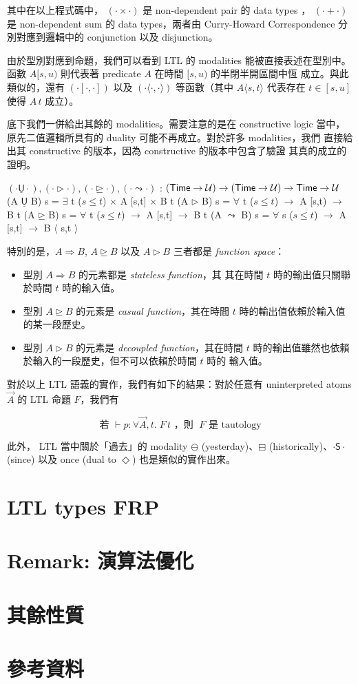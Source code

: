 \documentclass{article}
\newcommand{\U}{\mathcal{U}}
\begin{document}
  其中在以上程式碼中， $(\cdot\times\cdot)$ 是 non-dependent pair 的 data types
  ， $(\cdot+\cdot)$ 是 non-dependent sum 的 data types，兩者由 Curry-Howard
  Correspondence 分別對應到邏輯中的 conjunction 以及 disjunction。

  由於型別對應到命題，我們可以看到 LTL 的 modalities 能被直接表述在型別中。
  函數 $A [s,u)$ 則代表著 predicate $A$ 在時間 $[s,u)$ 的半閉半開區間中恆
  成立。與此類似的，還有 $(\cdot[\cdot,\cdot])$ 以及
  $(\cdot\langle\cdot,\cdot\rangle)$ 等函數（其中 $A\langle s,t\rangle$
  代表存在 $t\in [s,u]$ 使得 $A\,t$ 成立）。

  底下我們一併給出其餘的 modalities。需要注意的是在 constructive logic
  當中，原先二值邏輯所具有的 duality 可能不再成立。對於許多 modalities，我們
  直接給出其 constructive 的版本，因為 constructive 的版本中包含了驗證
  其真的成立的證明。

  \begin{code}
  $(\cdot\underline{\mathsf{U}}\cdot),(\cdot\rhd\cdot),(\cdot\unrhd\cdot),(\cdot\leadsto\cdot)$ : $(\Time\to\U)\to(\Time\to\U)\to\Time\to\U$
  (A $\underline{\mathsf{U}}$ B) s = $\exists$ {t} ($s\le t$) $\times$ A [s,t] $\times$ B t
  (A $\rhd$ B) s = $\forall$ {t} ($s\le t$) $\to$ A [s,t) $\to$ B t
  (A $\unrhd$ B) s = $\forall$ {t} ($s\le t$) $\to$ A [s,t] $\to$ B t
  (A $\leadsto$ B) s = $\forall$ {s} ($s\le t$) $\to$ A [s,t] $\to$ B $\langle$ s,t $\rangle$
  \end{code}

  特別的是，$A\Rightarrow B$, $A\unrhd B$ 以及 $A\rhd B$ 三者都是
  \emph{function space}：

  \begin{itemize}
    \item 型別 $A\Rightarrow B$ 的元素都是 \emph{stateless function}，其
    其在時間 $t$ 時的輸出值只關聯於時間 $t$ 時的輸入值。

    \item 型別 $A\unrhd B$ 的元素是 \emph{casual function}，其在時間 $t$
    時的輸出值依賴於輸入值的某一段歷史。

    \item 型別 $A\rhd B$ 的元素是 \emph{decoupled function}，其在時間 $t$
    時的輸出值雖然也依賴於輸入的一段歷史，但不可以依賴於時間 $t$ 時的
    輸入值。
  \end{itemize}

  對於以上 LTL 語義的實作，我們有如下的結果：對於任意有 uninterpreted atoms
  $\overrightarrow{A}$ 的 LTL 命題 $F$，我們有

  \[ \text{若 } \vdash p:\forall{\overrightarrow{A}},t.\; F\,t \text{ ，則 } \;F \text{ 是 tautology}\]

  此外， LTL 當中關於「過去」的 modality $\ominus$ (yesterday)、$\boxminus$
  (historically)、$\cdot\mathsf{S}\cdot$ (since) 以及 once (dual to $\Diamond$)
  也是類似的實作出來。

\section{LTL types FRP}
\section{Remark: 演算法優化}
\section{其餘性質}
\section{參考資料}
\end{document}
